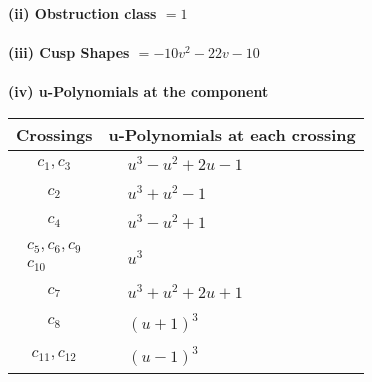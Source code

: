 \documentclass[1p]{elsarticle_modified}
\theoremstyle{definition}
\begin{document}
\flushleft \textbf{(ii) Obstruction class $= 1$}\\~\\
\flushleft \textbf{(iii) Cusp Shapes $= -10 v^2-22 v-10$}\\~\\
\newpage\renewcommand{\arraystretch}{1}
\flushleft \textbf{(iv) u-Polynomials at the component}\newline \\
\begin{tabular}{m{50pt}|m{274pt}}
Crossings & \hspace{64pt}u-Polynomials at each crossing \\
\hline $$\begin{aligned}c_{1},c_{3}\end{aligned}$$&$\begin{aligned}
&u^3- u^2+2 u-1
\end{aligned}$\\
\hline $$\begin{aligned}c_{2}\end{aligned}$$&$\begin{aligned}
&u^3+u^2-1
\end{aligned}$\\
\hline $$\begin{aligned}c_{4}\end{aligned}$$&$\begin{aligned}
&u^3- u^2+1
\end{aligned}$\\
\hline $$\begin{aligned}c_{5},c_{6},c_{9}\\c_{10}\end{aligned}$$&$\begin{aligned}
&u^3
\end{aligned}$\\
\hline $$\begin{aligned}c_{7}\end{aligned}$$&$\begin{aligned}
&u^3+u^2+2 u+1
\end{aligned}$\\
\hline $$\begin{aligned}c_{8}\end{aligned}$$&$\begin{aligned}
&(u+1)^3
\end{aligned}$\\
\hline $$\begin{aligned}c_{11},c_{12}\end{aligned}$$&$\begin{aligned}
&(u-1)^3
\end{aligned}$\\
\hline
\end{tabular}\\~\\
\end{document}
